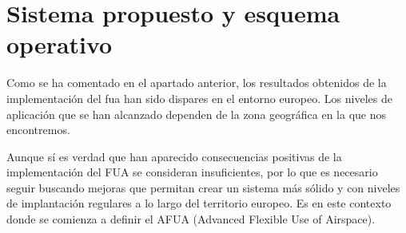 \chapter{Sistema propuesto y esquema operativo}

Como se ha comentado en el apartado anterior, los resultados obtenidos de la implementación del \acrfull{fua} han sido dispares en el entorno europeo. Los niveles de aplicación que se han alcanzado dependen de la zona geográfica en la que nos encontremos.

Aunque sí es verdad que han aparecido consecuencias positivas de la implementación del FUA se consideran insuficientes, por lo que es necesario seguir buscando mejoras que permitan crear un sistema más sólido y con niveles de implantación regulares a lo largo del territorio europeo. Es en este contexto donde se comienza a definir el AFUA (Advanced Flexible Use of Airspace).







    
    
